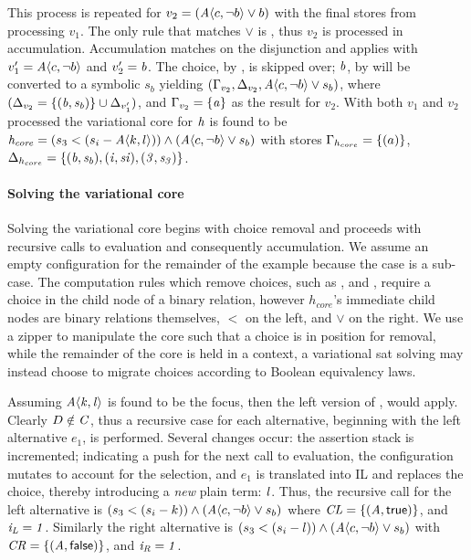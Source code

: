 This process is repeated for $v_{2} = (\chc[A]{c,\neg b} \vee b)$ with the final
stores from processing $v_{1}$. The only rule that matches $\vee$ is
, thus $v_{2}$ is processed in accumulation. Accumulation
matches on the disjunction and applies  with $v_{1}' =
\chc[A]{c,\neg b}$ and $v_{2}' = \mathit{b}$. The choice, by , is
skipped over; $\mathit{b}$, by  will be converted to a symbolic
$s_{b}$ yielding $(\eStore{v_{2}}, \aStore{v_{2}}, \chc[A]{c,\neg b} \vee
s_{b})$, where $(\Delta_{v_{2}} = \{(\mathit{b}, \mathit{s_{b}})\} \cup
\Delta_{v_{1}'})$, and $\Gamma_{v_{2}} = \{\mathit{a}\}$ as the result for $v_{2}$.
With both $v_{1}$ and $v_{2}$ processed the variational core for $\mathit{h}$ is
found to be $\kf{h_{core}} = (s_{3} < (s_{i} - \chc[A]{k,l})) \wedge
(\chc[A]{c,\neg b} \vee s_{b})$ with stores $\Gamma_{h_{core}} = \{(a)\}$,
$\Delta_{h_{core}} = \{\mathit{(b,s_{b}), (i,s{i}), (3,s_{3})}\}$.%

\paragraph{Solving the variational core}
Solving the variational core begins with choice removal and proceeds with
recursive calls to evaluation and consequently accumulation. We assume an empty
configuration for the remainder of the example because the \vc{} case is a
sub-case. The computation rules which remove choices, such as ,
and , require a choice in the child node of a binary
relation, however $h_{core}$'s immediate child nodes are binary relations
themselves, $<$ on the left, and $\vee{}$ on the right. We use a zipper to
manipulate the core such that a choice is in position for removal, while the
remainder of the core is held in a context, a variational \ac{sat} solving may
instead choose to migrate choices according to Boolean equivalency laws.

Assuming $\kf{\chc[A]{k,l}}$ is found to be the focus, then the left version of
,  would apply. Clearly $D \notin
\mathit{C}{}$, thus a recursive case for each alternative, beginning with
the left alternative $e_{1}$, is performed. Several changes occur: the assertion
stack is incremented; indicating a push for the next call to evaluation, the
configuration mutates to account for the selection, and $e_{1}$ is translated
into IL and replaces the choice, thereby introducing a \textit{new} plain term:
$\mathit{l}$. Thus, the recursive call for the left alternative is $(s_{3} < (s_{i}
- k)) \wedge (\chc[A]{c,\neg b} \vee s_{b})$ where $\configuration{\kf{L}} =
\{(\kf{A}, \true{})\}$, and $\mathit{i_{\mathit{L}} = 1}$. Similarly the right
alternative is $(s_{3} < (s_{i} - l)) \wedge (\chc[A]{c,\neg b} \vee s_{b})$
with $\configuration{\kf{R}} = \{(\kf{A}, \false{})\}$, and $\mathit{i_{R} = 1}$.

